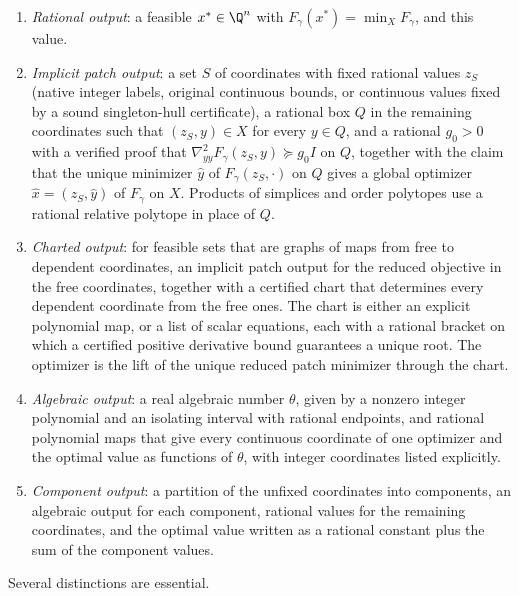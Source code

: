 \begin{definition}\label{def:model:outputs}
\leavevmode
\begin{enumerate}[label=(\alph*)]
\item\label{it:model:rational} \emph{Rational output}: a feasible
$x^*\in\Q^n$ with $F_\gamma(x^*)=\min_XF_\gamma$, and this value.
\item\label{it:model:implicit} \emph{Implicit patch output}: a set $S$ of
coordinates with fixed rational values $z_S$ (native integer labels,
original continuous bounds, or continuous values fixed by a sound
singleton-hull certificate), a rational box $Q$ in the remaining
coordinates such that $(z_S,y)\in X$ for every $y\in Q$, and a rational
$g_0>0$ with a verified proof that
$\nabla^2_{yy}F_\gamma(z_S,y)\succeq g_0I$ on $Q$, together with the claim
that the unique minimizer $\hat y$ of $F_\gamma(z_S,\cdot)$ on $Q$ gives a
global optimizer $\hat x=(z_S,\hat y)$ of $F_\gamma$ on $X$. Products of
simplices and order polytopes use a rational relative polytope in place of
$Q$.
\item\label{it:model:charted} \emph{Charted output}: for feasible sets that
are graphs of maps from free to dependent coordinates, an implicit patch
output for the reduced objective in the free coordinates, together with a
certified chart that determines every dependent coordinate from the free
ones. The chart is either an explicit polynomial map, or a list of scalar
equations, each with a rational bracket on which a certified positive
derivative bound guarantees a unique root. The optimizer is the lift of the
unique reduced patch minimizer through the chart.
\item\label{it:model:algebraic} \emph{Algebraic output}: a real algebraic
number $\theta$, given by a nonzero integer polynomial and an isolating
interval with rational endpoints, and rational polynomial maps that give
every continuous coordinate of one optimizer and the optimal value as
functions of $\theta$, with integer coordinates listed explicitly.
\item\label{it:model:component} \emph{Component output}: a partition of the
unfixed coordinates into components, an algebraic output for each
component, rational values for the remaining coordinates, and the optimal
value written as a rational constant plus the sum of the component values.
\end{enumerate}
\end{definition}

Several distinctions are essential.

